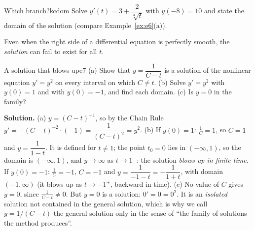 \documentclass[11pt]{article}
\begin{document}
\begin{kc}{Which branch?}{kcdom}
Solve $y'(t)=3+\dfrac2{\sqrt[3]t}$ with $y(-8)=10$ and state the domain of the solution (compare Example~\ref{ex:e6}(a)).
\end{kc}

Even when the right side of a differential equation is perfectly smooth, the \emph{solution} can fail to exist for all $t$.

\begin{exmp}{A solution that blows up}{e7}
(a) Show that $y=\dfrac1{C-t}$ is a solution of the nonlinear equation $y'=y^2$ on every interval on which $C\ne t$. (b) Solve $y'=y^2$ with $y(0)=1$ and with $y(0)=-1$, and find each domain. (c) Is $y=0$ in the family?

\textbf{Solution.} (a) $y=(C-t)^{-1}$, so by the Chain Rule $y'=-(C-t)^{-2}\cdot(-1)=\dfrac1{(C-t)^2}=y^2$.
(b) If $y(0)=1$: $\frac1C=1$, so $C=1$ and $y=\dfrac1{1-t}$. It is defined for $t\ne1$; the point $t_0=0$ lies in $(-\infty,1)$, so the domain is $(-\infty,1)$, and $y\to\infty$ as $t\to1^-$: the solution \emph{blows up in finite time}. If $y(0)=-1$: $\frac1C=-1$, $C=-1$ and $y=\dfrac1{-1-t}=-\dfrac1{1+t}$, with domain $(-1,\infty)$ (it blows up as $t\to-1^+$, backward in time).
(c) No value of $C$ gives $y=0$, since $\frac1{C-t}\ne0$. But $y=0$ is a solution: $0'=0=0^2$. It is an \emph{isolated} solution not contained in the general solution, which is why we call $y=1/(C-t)$ the general solution only in the sense of ``the family of solutions the method produces''.


\end{exmp}
\end{document}
